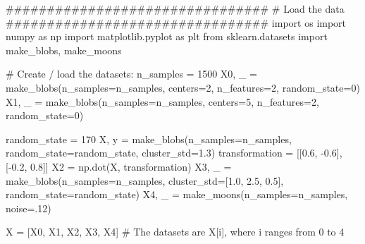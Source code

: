 \documentclass[
  letterpaper,
  DIV=11,
  numbers=noendperiod]{scrartcl}
\newenvironment{Shaded}{\begin{snugshade}}{\end{snugshade}}
\newcommand{\CommentTok}[1]{\textcolor[rgb]{0.37,0.37,0.37}{#1}}
\newcommand{\DecValTok}[1]{\textcolor[rgb]{0.68,0.00,0.00}{#1}}
\newcommand{\FloatTok}[1]{\textcolor[rgb]{0.68,0.00,0.00}{#1}}
\newcommand{\ImportTok}[1]{\textcolor[rgb]{0.00,0.46,0.62}{#1}}
\newcommand{\NormalTok}[1]{\textcolor[rgb]{0.00,0.23,0.31}{#1}}
\newcommand{\OperatorTok}[1]{\textcolor[rgb]{0.37,0.37,0.37}{#1}}
\begin{document}
\begin{Shaded}
\begin{Highlighting}[]
\CommentTok{\#\#\#\#\#\#\#\#\#\#\#\#\#\#\#\#\#\#\#\#\#\#\#\#\#\#\#\#\#\#\#\#}
\CommentTok{\# Load the data}
\CommentTok{\#\#\#\#\#\#\#\#\#\#\#\#\#\#\#\#\#\#\#\#\#\#\#\#\#\#\#\#\#\#\#\#}
\ImportTok{import}\NormalTok{ os}
\ImportTok{import}\NormalTok{ numpy }\ImportTok{as}\NormalTok{ np}
\ImportTok{import}\NormalTok{ matplotlib.pyplot }\ImportTok{as}\NormalTok{ plt}
\ImportTok{from}\NormalTok{ sklearn.datasets }\ImportTok{import}\NormalTok{ make\_blobs, make\_moons}

\CommentTok{\# Create / load the datasets:}
\NormalTok{n\_samples }\OperatorTok{=} \DecValTok{1500}
\NormalTok{X0, \_ }\OperatorTok{=}\NormalTok{ make\_blobs(n\_samples}\OperatorTok{=}\NormalTok{n\_samples, centers}\OperatorTok{=}\DecValTok{2}\NormalTok{, n\_features}\OperatorTok{=}\DecValTok{2}\NormalTok{, random\_state}\OperatorTok{=}\DecValTok{0}\NormalTok{)}
\NormalTok{X1, \_ }\OperatorTok{=}\NormalTok{ make\_blobs(n\_samples}\OperatorTok{=}\NormalTok{n\_samples, centers}\OperatorTok{=}\DecValTok{5}\NormalTok{, n\_features}\OperatorTok{=}\DecValTok{2}\NormalTok{, random\_state}\OperatorTok{=}\DecValTok{0}\NormalTok{)}

\NormalTok{random\_state }\OperatorTok{=} \DecValTok{170}
\NormalTok{X, y }\OperatorTok{=}\NormalTok{ make\_blobs(n\_samples}\OperatorTok{=}\NormalTok{n\_samples, random\_state}\OperatorTok{=}\NormalTok{random\_state, cluster\_std}\OperatorTok{=}\FloatTok{1.3}\NormalTok{)}
\NormalTok{transformation }\OperatorTok{=}\NormalTok{ [[}\FloatTok{0.6}\NormalTok{, }\OperatorTok{{-}}\FloatTok{0.6}\NormalTok{], [}\OperatorTok{{-}}\FloatTok{0.2}\NormalTok{, }\FloatTok{0.8}\NormalTok{]]}
\NormalTok{X2 }\OperatorTok{=}\NormalTok{ np.dot(X, transformation)}
\NormalTok{X3, \_ }\OperatorTok{=}\NormalTok{ make\_blobs(n\_samples}\OperatorTok{=}\NormalTok{n\_samples, cluster\_std}\OperatorTok{=}\NormalTok{[}\FloatTok{1.0}\NormalTok{, }\FloatTok{2.5}\NormalTok{, }\FloatTok{0.5}\NormalTok{], random\_state}\OperatorTok{=}\NormalTok{random\_state)}
\NormalTok{X4, \_ }\OperatorTok{=}\NormalTok{ make\_moons(n\_samples}\OperatorTok{=}\NormalTok{n\_samples, noise}\OperatorTok{=}\FloatTok{.12}\NormalTok{)}

\NormalTok{X }\OperatorTok{=}\NormalTok{ [X0, X1, X2, X3, X4]}
\CommentTok{\# The datasets are X[i], where i ranges from 0 to 4}
\end{Highlighting}
\end{Shaded}
\end{document}
